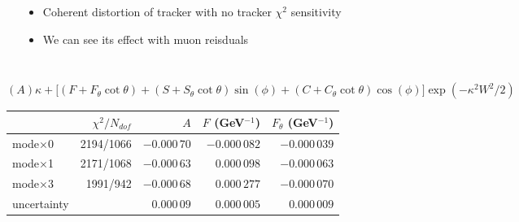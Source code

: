 \documentclass[compress]{beamer}
\begin{document}
\begin{frame}
\begin{columns}
\begin{columns}
\end{columns}

\begin{itemize}
\item Coherent distortion of tracker with no tracker $\chi^2$ sensitivity

\item We can see its effect with muon reisduals
\end{itemize}
\end{columns}

\vfill
\scriptsize

$(A)\kappa + \big[(F + F_{\theta}\cot\theta) + (S + S_{\theta}\cot\theta)\sin(\phi) + (C + C_{\theta}\cot\theta)\cos(\phi)\big]\exp(-\kappa^2 W^2 / 2)$

\vfill

\begin{tabular}{l r r r r}
 & $\chi^2/N_{dof}$ & $A$\hspace{0.35 cm} & $F$ (GeV$^{-1}$) & $F_{\theta}$ (GeV$^{-1}$) \\\hline
mode$\times$0 & 2194/1066 & $-0.000\,70$ & $-0.000\,082$ & $-0.000\,039$ \\
mode$\times$1 & 2171/1068 & $-0.000\,63$ & $0.000\,098$ & $-0.000\,063$  \\
mode$\times$3 & 1991/942 & $-0.000\,68$ & $0.000\,277$ & $-0.000\,070$ \\\hline
uncertainty & & $0.000\,09$ & $0.000\,005$ & $0.000\,009$ \\
\end{tabular}


\end{frame}
\end{document}
